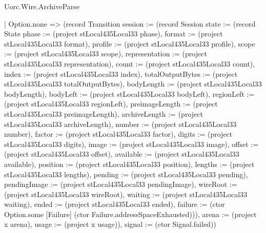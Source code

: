 \begin{lexlean}{Uorc.Wire.ArchiveParse}
\begin{semanticmodule}
{            | Option.none => (record Transition {session := (record Session {state := (record State {phase := (project stLocal435Local33 phase), format := (project stLocal435Local33 format), profile := (project stLocal435Local33 profile), scope := (project stLocal435Local33 scope), representation := (project stLocal435Local33 representation), count := (project stLocal435Local33 count), index := (project stLocal435Local33 index), totalOutputBytes := (project stLocal435Local33 totalOutputBytes), bodyLength := (project stLocal435Local33 bodyLength), bodyLeft := (project stLocal435Local33 bodyLeft), regionLeft := (project stLocal435Local33 regionLeft), preimageLength := (project stLocal435Local33 preimageLength), archiveLength := (project stLocal435Local33 archiveLength), number := (project stLocal435Local33 number), factor := (project stLocal435Local33 factor), digits := (project stLocal435Local33 digits), image := (project stLocal435Local33 image), offset := (project stLocal435Local33 offset), available := (project stLocal435Local33 available), position := (project stLocal435Local33 position), lengths := (project stLocal435Local33 lengths), pending := (project stLocal435Local33 pending), pendingImage := (project stLocal435Local33 pendingImage), wireRoot := (project stLocal435Local33 wireRoot), waiting := (project stLocal435Local33 waiting), ended := (project stLocal435Local33 ended), failure := (ctor Option.some [Failure] (ctor Failure.addressSpaceExhausted))}), arena := (project x arena), usage := (project x usage)}), signal := (ctor Signal.failed)})
}
\end{semanticmodule}
\end{lexlean}
